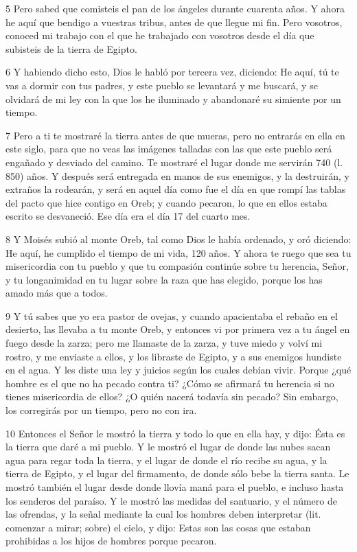 \par 5 Pero sabed que comisteis el pan de los ángeles durante cuarenta años. Y ahora he aquí que bendigo a vuestras tribus, antes de que llegue mi fin. Pero vosotros, conoced mi trabajo con el que he trabajado con vosotros desde el día que subisteis de la tierra de Egipto.

\par 6 Y habiendo dicho esto, Dios le habló por tercera vez, diciendo: He aquí, tú te vas a dormir con tus padres, y este pueblo se levantará y me buscará, y se olvidará de mi ley con la que los he iluminado y abandonaré su simiente por un tiempo.

\par 7 Pero a ti te mostraré la tierra antes de que mueras, pero no entrarás en ella en este siglo, para que no veas las imágenes talladas con las que este pueblo será engañado y desviado del camino. Te mostraré el lugar donde me servirán 740 (l. 850) años. Y después será entregada en manos de sus enemigos, y la destruirán, y extraños la rodearán, y será en aquel día como fue el día en que rompí las tablas del pacto que hice contigo en Oreb; y cuando pecaron, lo que en ellos estaba escrito se desvaneció. Ese día era el día 17 del cuarto mes.

\par 8 Y Moisés subió al monte Oreb, tal como Dios le había ordenado, y oró diciendo: He aquí, he cumplido el tiempo de mi vida, 120 años. Y ahora te ruego que sea tu misericordia con tu pueblo y que tu compasión continúe sobre tu herencia, Señor, y tu longanimidad en tu lugar sobre la raza que has elegido, porque los has amado más que a todos.

\par 9 Y tú sabes que yo era pastor de ovejas, y cuando apacientaba el rebaño en el desierto, las llevaba a tu monte Oreb, y entonces vi por primera vez a tu ángel en fuego desde la zarza; pero me llamaste de la zarza, y tuve miedo y volví mi rostro, y me enviaste a ellos, y los libraste de Egipto, y a sus enemigos hundiste en el agua. Y les diste una ley y juicios según los cuales debían vivir. Porque ¿qué hombre es el que no ha pecado contra ti? ¿Cómo se afirmará tu herencia si no tienes misericordia de ellos? ¿O quién nacerá todavía sin pecado? Sin embargo, los corregirás por un tiempo, pero no con ira.

\par 10 Entonces el Señor le mostró la tierra y todo lo que en ella hay, y dijo: Ésta es la tierra que daré a mi pueblo. Y le mostró el lugar de donde las nubes sacan agua para regar toda la tierra, y el lugar de donde el río recibe su agua, y la tierra de Egipto, y el lugar del firmamento, de donde sólo bebe la tierra santa. Le mostró también el lugar desde donde llovía maná para el pueblo, e incluso hasta los senderos del paraíso. Y le mostró las medidas del santuario, y el número de las ofrendas, y la señal mediante la cual los hombres deben interpretar (lit. comenzar a mirar; sobre) el cielo, y dijo: Estas son las cosas que estaban prohibidas a los hijos de hombres porque pecaron.

